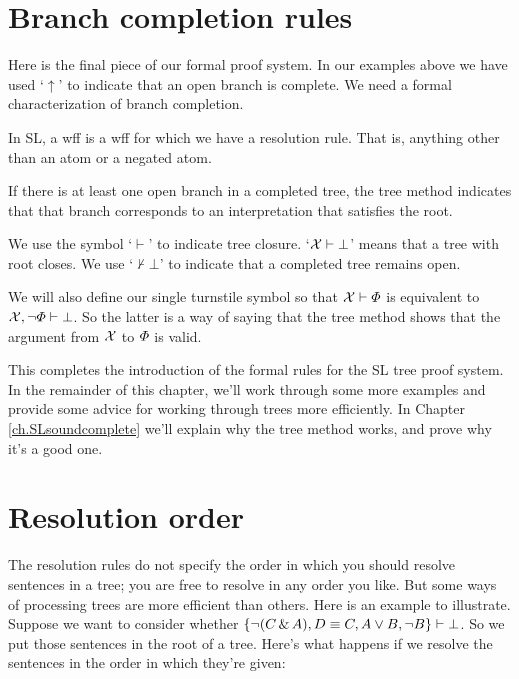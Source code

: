 \section{Branch completion rules}
\label{sec.SL.tree.completion}
Here is the final piece of our formal proof system. In our examples above we have used `$\uparrow$' to indicate that an open branch is complete. We need a formal characterization of branch completion.

In SL, a  wff is a wff for which we have a resolution rule. That is, anything other than an atom or a negated atom.


If there is at least one open branch in a completed tree, the tree method indicates that that branch corresponds to an interpretation that satisfies the root.

We use the symbol `$\vdash$' to indicate tree closure. `$\mathcal{X}{}\vdash{} \bot$' means that a tree with root \metaSetX{} closes. We use `$\nvdash{}\bot$' to indicate that a completed tree remains open.

We will also define our single turnstile symbol so that $\mathcal{X}{}\vdash{} \varPhi{}$ is equivalent to $\mathcal{X}{}, \neg\varPhi{}\vdash{}\bot$. So the latter is a way of saying that the tree method shows that the argument from $\mathcal{X}{}$ to $\varPhi{}$ is valid.

This completes the introduction of the formal rules for the SL tree proof system. In the remainder of this chapter, we'll work through some more examples and provide some advice for working through trees more efficiently. In Chapter \ref{ch.SLsoundcomplete} we'll explain why the tree method works, and prove why it's a good one.

\section{Resolution order}

The resolution rules do not specify the order in which you should resolve sentences in a tree; you are free to resolve in any order you like. But some ways of processing trees are more efficient than others. Here is an example to illustrate. Suppose we want to consider whether $\{\neg (C \,\&\, A), D \equiv C, A \vee B, \neg B\}\vdash{}\bot$. So we put those sentences in the root of a tree. Here's what happens if we resolve the sentences in the order in which they're given:

